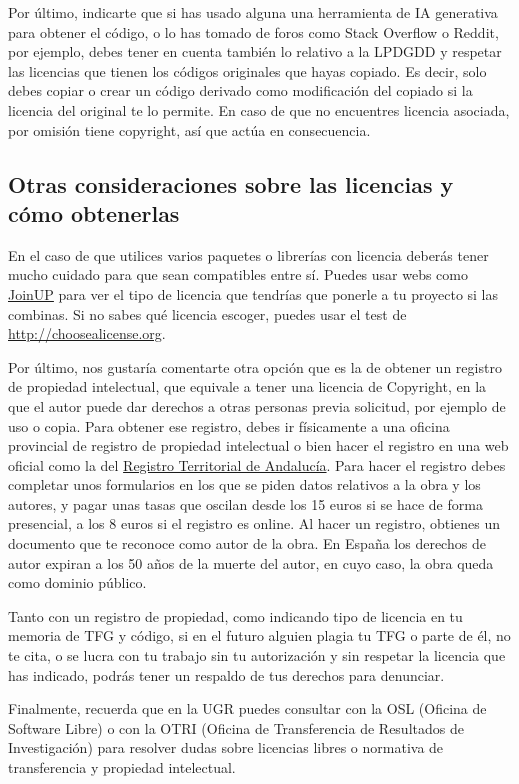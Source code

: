 Por último, indicarte que si has usado alguna una herramienta de IA generativa para obtener el código, o lo has tomado de foros como Stack Overflow o Reddit, por ejemplo, debes tener en cuenta también lo relativo a la LPDGDD y respetar las licencias que tienen los códigos originales que hayas copiado. Es decir, solo debes copiar o crear un código derivado como modificación del copiado si la licencia del original te lo permite. En caso de que no encuentres licencia asociada, por omisión tiene copyright, así que actúa en consecuencia.


\subsection{Otras consideraciones sobre las licencias y cómo obtenerlas}

En el caso de que utilices varios paquetes o librerías con licencia deberás tener mucho cuidado para que sean compatibles entre sí. Puedes usar webs como \href{https://joinup.ec.europa.eu/collection/eupl/soluti on/joinup-licensing-assistant/jla-compatibility-ch ecker}{JoinUP} para ver el tipo de licencia que tendrías que ponerle a tu proyecto si las combinas. Si no sabes qué licencia escoger, puedes usar el test de \url{http://choosealicense.org}.

Por último, nos gustaría comentarte otra opción que es la de obtener un registro de propiedad intelectual, que equivale a tener una licencia de Copyright, en la que el autor puede dar derechos a otras personas previa solicitud, por ejemplo de uso o copia. Para obtener ese registro, debes ir físicamente a una oficina provincial de registro de propiedad intelectual o bien hacer el registro en una web oficial como la del \href{https://www.juntadeandalucia.es/organismos/turismoculturaydeporte/servicios/procedimientos/detalle/297.html}{Registro Territorial de Andalucía}. Para hacer el registro debes completar unos formularios en los que se piden datos relativos a la obra y los autores, y pagar unas tasas que oscilan desde los 15 euros si se hace de forma presencial, a los 8 euros si el registro es online. Al hacer un registro, obtienes un documento que te reconoce como autor de la obra. En España los derechos de autor expiran a los 50 años de la muerte del autor, en cuyo caso, la obra queda como dominio público.

Tanto con un registro de propiedad, como indicando tipo de licencia en tu memoria de TFG y código, si en el futuro alguien plagia tu TFG o parte de él, no te cita, o se lucra con tu trabajo sin tu autorización y sin respetar la licencia que has indicado, podrás tener un respaldo de tus derechos para denunciar.

Finalmente, recuerda que en la UGR puedes consultar con la OSL (Oficina de Software Libre) o con la OTRI (Oficina de Transferencia de Resultados de Investigación) para resolver dudas sobre licencias libres o normativa de transferencia y propiedad intelectual.